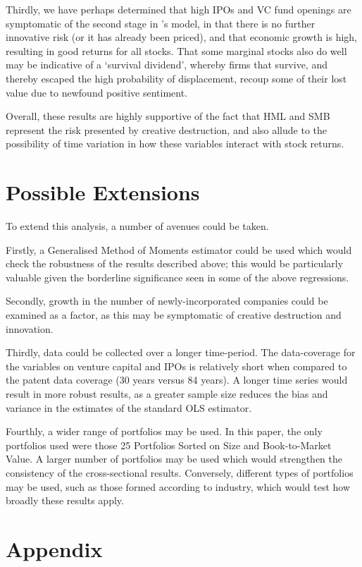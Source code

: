 \documentclass[12pt]{article}
\begin{document}
Thirdly, we have perhaps determined that high IPOs and VC fund openings are symptomatic of the second stage in \cite{helpman1994}'s model, in that there is no further innovative risk (or it has already been priced), and that economic growth is high, resulting in good returns for all stocks. That some marginal stocks also do well may be indicative of a `survival dividend', whereby firms that survive, and thereby escaped the high probability of displacement, recoup some of their lost value due to newfound positive sentiment.  

Overall, these results are highly supportive of the fact that HML and SMB represent the risk presented by creative destruction, and also allude to the possibility of time variation in how these variables interact with stock returns. 

\section{Possible Extensions}

To extend this analysis, a number of avenues could be taken.

Firstly, a Generalised Method of Moments estimator could be used which would check the robustness of the results described above; this would be particularly valuable given the borderline significance seen in some of the above regressions.

Secondly, growth in the number of newly-incorporated companies could be examined as a factor, as this may be symptomatic of creative destruction and innovation.

Thirdly, data could be collected over a longer time-period. The data-coverage for the variables on venture capital and IPOs is relatively short when compared to the patent data coverage (30 years versus 84 years). A longer time series would result in more robust results, as a greater sample size reduces the bias and variance in the estimates of the standard OLS estimator.

Fourthly, a wider range of portfolios may be used. In this paper, the only portfolios used were those 25 Portfolios Sorted on Size and Book-to-Market Value. A larger number of portfolios may be used which would strengthen the consistency of the cross-sectional results. Conversely, different types of portfolios may be used, such as those formed according to industry, which would test how broadly these results apply.
\section{Appendix}
\end{document}
